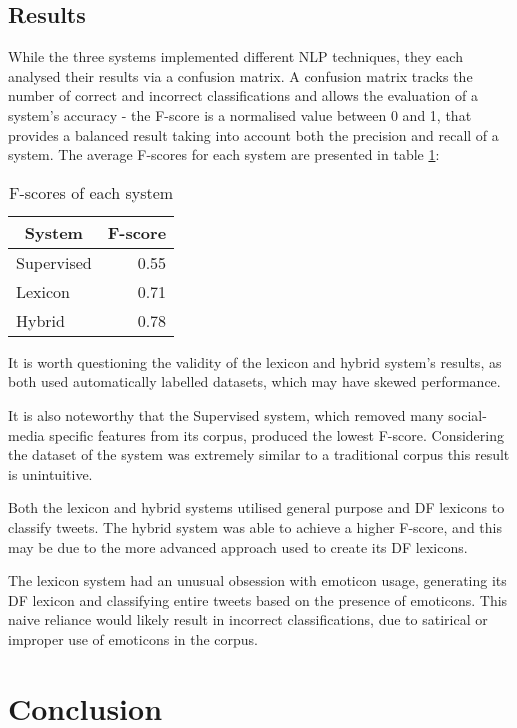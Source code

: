 \documentclass[twocolumn]{article}
\begin{document}
\subsection{Results}
While the three systems implemented different NLP techniques, they each
analysed their results via a confusion matrix.
A confusion matrix tracks the number of correct and incorrect classifications
and allows the evaluation of a system's accuracy - the F-score is a normalised
value between 0 and 1, that provides a balanced result taking into account
both the precision and recall of a system.
The average F-scores for each system are presented in table \ref{my-label}:

\begin{table}[h]
\centering
\caption{F-scores of each system}
\label{my-label}
\begin{tabular}{l|r}
\multicolumn{1}{c|}{System} & \multicolumn{1}{c}{F-score} \\ \hline
Supervised                  & 0.55                        \\
Lexicon                     & 0.71                        \\
Hybrid                      & 0.78                       
\end{tabular}
\end{table}

It is worth questioning the validity of the lexicon and hybrid system's
results, as both used automatically labelled datasets, which may have skewed
performance.

It is also noteworthy that the Supervised system, which removed many
social-media specific features from its corpus, produced the lowest F-score.
Considering the dataset of the system was extremely similar to a traditional
corpus this result is unintuitive.

Both the lexicon and hybrid systems utilised general purpose and DF lexicons to
classify tweets.
The hybrid system was able to achieve a higher F-score, and this may be due to
the more advanced approach used to create its DF lexicons.

The lexicon system had an unusual obsession with emoticon usage, generating
its DF lexicon and classifying entire tweets based on the presence of
emoticons.
This naive reliance would likely result in incorrect classifications, due to
satirical or improper use of emoticons in the corpus.

\section{Conclusion}
\end{document}

